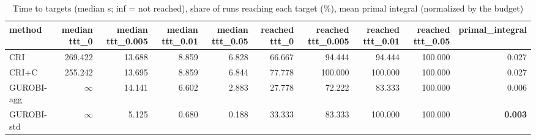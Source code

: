 \begin{table}[htbp]
\centering
\small
\caption{Time to targets (median s; inf = not reached), share of runs reaching each target (\%), mean primal integral (normalized by the budget)}
\label{tab:E3_long_runs_b600_ttt}
\begin{tabular}{lrrrrrrrrr}
\toprule
method & median ttt\_0 & median ttt\_0.005 & median ttt\_0.01 & median ttt\_0.05 & reached ttt\_0 & reached ttt\_0.005 & reached ttt\_0.01 & reached ttt\_0.05 & primal\_integral \\
\midrule
CRI & 269.422 & 13.688 & 8.859 & 6.828 & 66.667 & 94.444 & 94.444 & 100.000 & 0.027 \\
CRI+C & 255.242 & 13.695 & 8.859 & 6.844 & 77.778 & 100.000 & 100.000 & 100.000 & 0.027 \\
GUROBI-agg & $\infty$ & 14.141 & 6.602 & 2.883 & 27.778 & 72.222 & 83.333 & 100.000 & 0.006 \\
GUROBI-std & $\infty$ & 5.125 & 0.680 & 0.188 & 33.333 & 83.333 & 100.000 & 100.000 & \textbf{0.003} \\
\bottomrule
\end{tabular}
\end{table}
